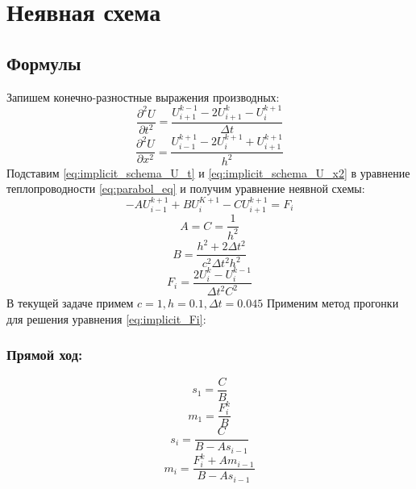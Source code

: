 \documentclass[a4paper]{article}
\begin{document}
\section{Неявная схема}
    \subsection{Формулы}
        Запишем конечно-разностные выражения производных:
        \begin{equation}\label{eq:implicit_schema_U_t}
            \frac{\partial^{2} U}{\partial t^{2}}=\frac{U^{k-1}_{i+1}-2 U^{k}_{i+1}-U^{k+1}_{i}}{\Delta t}
        \end{equation}
        \begin{equation}\label{eq:implicit_schema_U_x2}
            \frac{\partial^{2} U}{\partial x^{2}}=\frac{U^{k+1}_{i-1}-2 U^{k+1}_{i} +U^{k+1}_{i+1}}{h^2}
        \end{equation}
        Подставим \ref{eq:implicit_schema_U_t} и \ref{eq:implicit_schema_U_x2} в уравнение теплопроводности \ref{eq:parabol_eq} и получим уравнение неявной схемы:
        \begin{equation}\label{eq:implicit_Fi}
            -A U^{k+1}_{i-1}+B U^{K+1}_{i}- C U^{k+1}_{i+1}=F_{i}
        \end{equation}
        \begin{equation}
            A=C=\frac{1}{h^2}
        \end{equation}
        \begin{equation}
            B=\frac{h^{2}+ 2 \Delta t^2}{c^{2} \Delta t^2 h^2}
        \end{equation}
        \begin{equation}
            F_i=\frac{2 U^{k}_{i} - U^{k-1}_{i}}{\Delta t^2 C^2}
        \end{equation}
        В текущей задаче примем $c=1,h=0.1, \Delta t=0.045$
        Применим метод прогонки для решения уравнения \ref{eq:implicit_Fi}:
        \subsubsection*{Прямой ход:}
            \begin{equation}
                s_1=\frac{C}{B}
            \end{equation}
            \begin{equation}
                m_1=\frac{F^{k}_{i}}{B}
            \end{equation}
            \begin{equation}
                s_i=\frac{C}{B-A s_{i-1}}
            \end{equation}
            \begin{equation}
                m_i=\frac{F^{k}_i+A m_{i-1}}{B-A s_{i-1}}
            \end{equation}
\end{document}
